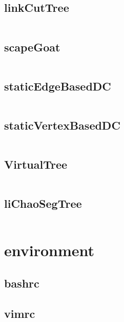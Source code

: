 \subsection{linkCutTree}
  \inputminted{cpp}{../code/data_structure/linkCutTree.cpp}
\subsection{scapeGoat}
  \inputminted{cpp}{../code/data_structure/scapeGoat.cpp}
\subsection{staticEdgeBasedDC}
  \inputminted{cpp}{../code/data_structure/staticEdgeBasedDC.cpp}
\subsection{staticVertexBasedDC}
  \inputminted{cpp}{../code/data_structure/staticVertexBasedDC.cpp}
\subsection{VirtualTree}
  \inputminted{cpp}{../code/data_structure/VirtualTree.cpp}
\subsection{liChaoSegTree}
  \inputminted{cpp}{../code/data_structure/liChaoSegTree.cpp}
\section{environment}
\subsection{bashrc}
\subsection{vimrc}

